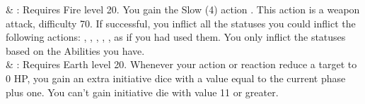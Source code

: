 \begin{tabjob}
     & %
    : Requires Fire level 20. You gain the Slow (4) action . This action is a weapon attack, difficulty 70. If successful, you inflict all the statuses you could inflict the following actions: , , , , , as if you had used them. You only inflict the statuses based on the Abilities you have. \\
     & %
    : Requires Earth level 20. Whenever your action or reaction reduce a target to 0 HP, you gain an extra initiative dice with a value equal to the current phase plus one. You can’t gain initiative die with value 11 or greater. \\
\end{tabjob}
\clearpage